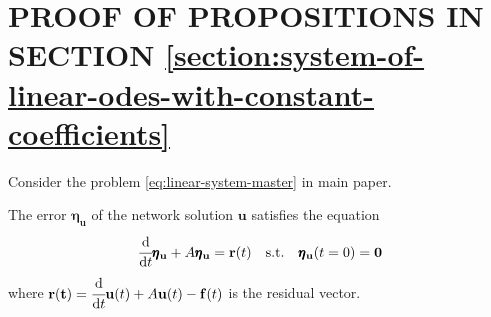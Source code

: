 \documentclass[accepted]{uai2023}
\newcommand{\vect}[1]{\mathbf{#1}}
\newcommand{\dt}[1]{\cfrac{\mathrm{d} #1}{\mathrm{d} t}}
\newcommand{\Err}{\eta}
\begin{document}
\section{PROOF OF PROPOSITIONS IN SECTION \ref{section:system-of-linear-odes-with-constant-coefficients}}
    Consider the problem \ref{eq:linear-system-master} in main paper. 

    The error $\pmb{\Err}_{\vect{u}}$ of the network solution $\vect{u}$ satisfies the equation
    \begin{equation}\label{eq:system-err-equation}
        \dt{} \pmb{\Err}_{\vect{u}} + A\pmb{\Err}_{\vect{u}} = \vect{r}(t) \quad \text{s.t.} \quad \pmb{\Err}_{\vect{u}}(t=0) = \vect{0}
    \end{equation}
    where $\vect{r(t)} = \dt{}\vect{u}(t) + A\vect{u}(t) - \vect{f}(t)$ is the residual vector.
\end{document}
